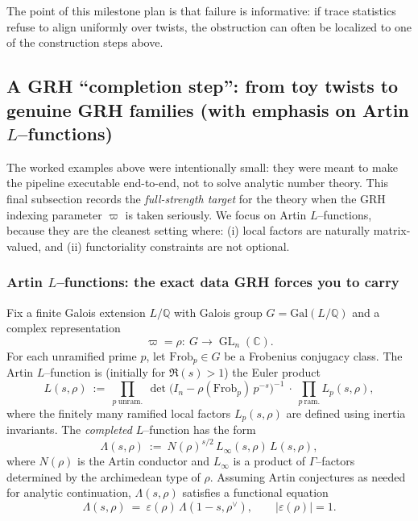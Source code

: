 \documentclass[11pt,oneside]{amsbook}
\numberwithin{equation}{section}
\theoremstyle{plain}
\theoremstyle{definition}
\theoremstyle{remark}
\newcommand{\Q}{\mathbb{Q}}
\newcommand{\C}{\mathbb{C}}
\DeclareMathOperator{\GL}{\mathrm{GL}}
\begin{document}
The point of this milestone plan is that failure is informative:
if trace statistics refuse to align uniformly over twists, the obstruction can often be localized to one of the construction steps above.


\subsection{A GRH ``completion step'': from toy twists to genuine GRH families (with emphasis on Artin $L$--functions)}
\label{sec:GRH_artin_completion}

The worked examples above were intentionally small: they were meant to make the pipeline executable end-to-end, not to solve analytic number theory.
This final subsection records the \emph{full-strength target} for the theory when the GRH indexing parameter $\varpi$ is taken seriously.
We focus on Artin $L$--functions, because they are the cleanest setting where:
(i) local factors are naturally matrix-valued, and
(ii) functoriality constraints are not optional.

\subsubsection{Artin $L$--functions: the exact data GRH forces you to carry}

Fix a finite Galois extension $L/\Q$ with Galois group $G=\mathrm{Gal}(L/\Q)$ and a complex representation
\[
\varpi=\rho:\ G\to \GL_n(\C).
\]
For each unramified prime $p$, let $\mathrm{Frob}_p\in G$ be a Frobenius conjugacy class.
The Artin $L$--function is (initially for $\Re(s)>1$) the Euler product
\begin{equation}
\label{eq:artin_L_euler}
L(s,\rho)\ :=\ \prod_{p\ \mathrm{unram.}}\ \det\!\big(I_n-\rho(\mathrm{Frob}_p)\,p^{-s}\big)^{-1}\ \cdot\ \prod_{p\ \mathrm{ram.}}L_p(s,\rho),
\end{equation}
where the finitely many ramified local factors $L_p(s,\rho)$ are defined using inertia invariants.
The \emph{completed} $L$--function has the form
\begin{equation}
\label{eq:completed_artin}
\Lambda(s,\rho)\ :=\ N(\rho)^{s/2}\,L_\infty(s,\rho)\,L(s,\rho),
\end{equation}
where $N(\rho)$ is the Artin conductor and $L_\infty$ is a product of $\Gamma$--factors determined by the archimedean type of $\rho$.
Assuming Artin conjectures as needed for analytic continuation, $\Lambda(s,\rho)$ satisfies a functional equation
\begin{equation}
\label{eq:artin_FE}
\Lambda(s,\rho)\ =\ \varepsilon(\rho)\,\Lambda(1-s,\rho^\vee),
\qquad |\varepsilon(\rho)|=1.
\end{equation}
\end{document}
